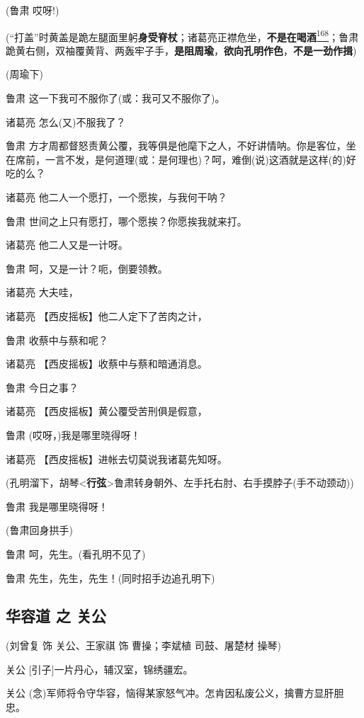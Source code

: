 (鲁肃 哎呀!)

(``打盖''时黄盖是跪左腿面里躬\textbf{身受脊杖}；诸葛亮正襟危坐，\textbf{不是在喝酒}\protect\hyperlink{fn168}{\textsuperscript{168}}；鲁肃跪黄右侧，双袖覆黄背、两轰牢子手，\textbf{是阻周瑜}，\textbf{欲向孔明作色}，\textbf{不是一劲作揖})

(周瑜下)

鲁肃 这一下我可不服你了(或：我可又不服你了)。

诸葛亮 怎么(又)不服我了？

鲁肃
方才周都督怒责黄公覆，我等俱是他麾下之人，不好讲情呐。你是客位，坐在席前，一言不发，是何道理(或：是何理也)？呵，难倒(说)这酒就是这样(的)好吃的么？

诸葛亮 他二人一个愿打，一个愿挨，与我何干呐？

鲁肃 世间之上只有愿打，哪个愿挨？你愿挨我就来打。

诸葛亮 他二人又是一计呀。

鲁肃 呵，又是一计？呃，倒要领教。

诸葛亮 大夫哇，

诸葛亮 【西皮摇板】他二人定下了苦肉之计，

鲁肃 收蔡中与蔡和呢？

诸葛亮 【西皮摇板】收蔡中与蔡和暗通消息。

鲁肃 今日之事？

诸葛亮 【西皮摇板】黄公覆受苦刑俱是假意，

鲁肃 (哎呀，)我是哪里晓得呀！

诸葛亮 【西皮摇板】进帐去切莫说我诸葛先知呀。

(孔明溜下，胡琴\textless{}\textbf{行弦}\textgreater{}鲁肃转身朝外、左手托右肘、右手摸脖子(手不动颈动))

鲁肃 我是哪里晓得呀！

(鲁肃回身拱手)

鲁肃 呵，先生。(看孔明不见了)

鲁肃 先生，先生，先生！(同时招手边追孔明下)

\hypertarget{ux534eux5bb9ux9053-ux4e4b-ux5173ux516c}{%
\subsection{华容道 之
关公}\label{ux534eux5bb9ux9053-ux4e4b-ux5173ux516c}}

(刘曾复 饰 关公、王家祺 饰 曹操；李斌植 司鼓、屠楚材 操琴)

关公 {[}引子{]}一片丹心，辅汉室，锦绣疆宏。

关公
(念)军师将令守华容，恼得某家怒气冲。怎肯因私废公义，擒曹方显肝胆忠。

